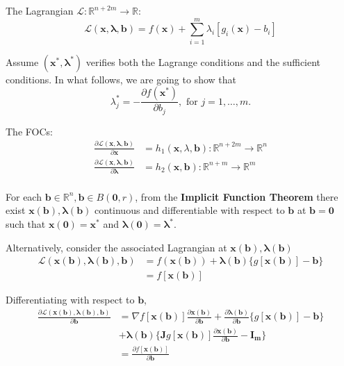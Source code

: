 The Lagrangian $\mathcal{L}: \mathbb{R}^{n + 2m} \to \mathbb{R}$: \[
    \mathcal{L}(\mathbf{x, \boldsymbol{\lambda}, \mathbf{b}}) = f(\mathbf{x}) + \sum_{i=1}^{m} \lambda_i[g_i(\mathbf{x}) - b_i]
\]

Assume $\mathbf{(x ^{*}, \boldsymbol{\lambda ^{*}})}$ verifies both the Lagrange conditions and the sufficient conditions. In what follows, we are going to show that \[
    \lambda_j ^{*} = - \frac{\partial f(\mathbf{x ^{*}})}{\partial b_j}, \text{ for } j = 1,\dots,m.
\]

The FOCs: \begin{align*}
    \frac{\partial \mathcal{L}(\mathbf{x, \boldsymbol{\lambda}, b})}{\partial \mathbf{x}}           & = h_1(\mathbf{x, \mathcal{\lambda}, \mathbf{b}}) : \mathbb{R}^{n+2m} \to \mathbb{R}^{n} \\
    \frac{\partial \mathcal{L}(\mathbf{x, \boldsymbol{\lambda}, b})}{\partial \boldsymbol{\lambda}} & = h_2(\mathbf{x, \mathbf{b}}): \mathbb{R}^{n+m} \to \mathbb{R}^{m}                      \\
\end{align*}

For each $\mathbf{b} \in  \mathbb{R}^{n}, \mathbf{b} \in B(\mathbf{0}, r)$, from the \textbf{Implicit Function Theorem} there exist $\mathbf{x(b), \boldsymbol{\lambda}(\mathbf{b})}$ continuous and differentiable with respect to $\mathbf{b}$ at $\mathbf{b = 0}$ such that $\mathbf{x(0) = x ^{*}}$ and $\boldsymbol{\lambda(0)=\lambda ^{*}}$.

Alternatively, consider the associated Lagrangian at $\mathbf{x(b)}, \boldsymbol{\lambda(b)}$ \begin{align*}
    \mathcal{L}(\mathbf{x\boldsymbol{(\mathbf{b})}, \boldsymbol{\lambda(\mathbf{b})}, \mathbf{b}})
     & = f(\mathbf{x\boldsymbol{(\mathbf{b})}}) +
    \boldsymbol{\lambda(\mathbf{b})}\{g[\mathbf{x\boldsymbol{(\mathbf{b})}}]-\mathbf{b}\} \\
     & = f[\mathbf{x\boldsymbol{(\mathbf{b})}}]
\end{align*}

Differentiating with respect to $\mathbf{b}$,
\begin{align*}
    \frac{\partial \mathcal{L}(\mathbf{x\boldsymbol{(\mathbf{b})}, \boldsymbol{\lambda(\mathbf{b})}, \mathbf{b}})}{\partial \mathbf{b}}
     & = \nabla f[\mathbf{x\boldsymbol{(\mathbf{b})}}]\frac{\partial \mathbf{x\boldsymbol{(\mathbf{b})}}}{\partial \mathbf{b}} + \frac{\partial \boldsymbol{\lambda(\mathbf{b})}}{\partial \mathbf{b}}\{g[\mathbf{x\boldsymbol{(\mathbf{b})}}]-\mathbf{b}\} \\
     & + \boldsymbol{\lambda(\mathbf{b})}\Biggl\{\mathbf{J}g[\mathbf{x\boldsymbol{(\mathbf{b})}}]\frac{\partial \mathbf{x \boldsymbol{(\mathbf{b})}}}{\partial \mathbf{b}}- \boldsymbol{I_m}\Biggr\}                                                        \\
     & =\frac{\partial f[\mathbf{x(b)}]}{\partial \mathbf{b}}
\end{align*}

